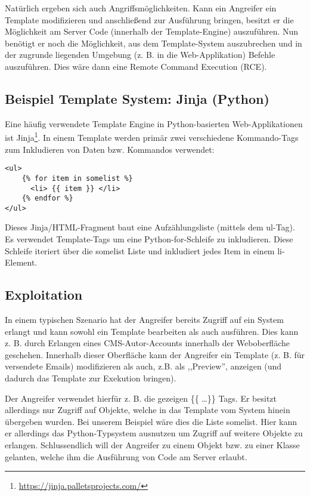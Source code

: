 Natürlich ergeben sich auch Angriffsmöglichkeiten. Kann ein Angreifer ein Template modifizieren und anschließend zur Ausführung bringen, besitzt er die Möglichkeit am Server Code (innerhalb der Template-Engine) auszuführen. Nun benötigt er noch die Möglichkeit, aus dem Template-System auszubrechen und in der zugrunde liegenden Umgebung (z. B. in die Web-Applikation) Befehle auszuführen. Dies wäre dann eine Remote Command Execution (RCE).

\subsection{Beispiel Template System: Jinja (Python)}

Eine häufig verwendete Template Engine in Python-basierten Web-Applikationen ist Jinja\footnote{\url{https://jinja.palletsprojects.com/}}. In einem Template werden primär zwei verschiedene Kommando-Tags zum Inkludieren von Daten bzw. Kommandos verwendet:

\begin{verbatim}
<ul>
	{% for item in somelist %}
	  <li> {{ item }} </li>
	{% endfor %}
</ul>
\end{verbatim}

Dieses Jinja/HTML-Fragment baut eine Aufzählungsliste (mittels dem ul-Tag). Es verwendet Template-Tags um eine Python-for-Schleife zu inkludieren. Diese Schleife iteriert über die somelist Liste und inkludiert jedes Item in einem li-Element.

\subsection{Exploitation}

In einem typischen Szenario hat der Angreifer bereits Zugriff auf ein System erlangt und kann sowohl ein Template bearbeiten als auch ausführen. Dies kann z. B. durch Erlangen eines CMS-Autor-Accounts innerhalb der Weboberfläche geschehen. Innerhalb dieser Oberfläche kann der Angreifer ein Template (z. B. für versendete Emails) modifizieren als auch, z.B. als ,,Preview'', anzeigen (und dadurch das Template zur Exekution bringen).

Der Angreifer verwendet hierfür z. B. die gezeigen \{\{ \ldots \}\} Tags. Er besitzt allerdings nur Zugriff auf Objekte, welche in das Template vom System hinein übergeben wurden. Bei unserem Beispiel wäre dies die Liste somelist. Hier kann er allerdings das Python-Typsystem ausnutzen um Zugriff auf weitere Objekte zu erlangen. Schlussendlich will der Angreifer zu einem Objekt bzw. zu einer Klasse gelanten, welche ihm die Ausführung von Code am Server erlaubt.

